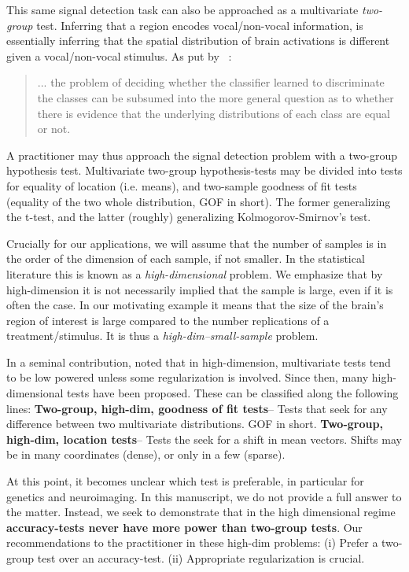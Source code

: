 \documentclass[]{bio}
\begin{document}
This same signal detection task can also be approached as a multivariate \emph{two-group} test.
Inferring that a region encodes vocal/non-vocal information, is essentially inferring that the spatial distribution of brain activations is different given a vocal/non-vocal stimulus. 
As put by ~\cite{pereira_machine_2009}: 
\begin{quote}
	... the problem of deciding whether the classifier learned to discriminate the classes can be subsumed into the more general question as to whether there is evidence that the underlying distributions of each class are equal or not.
\end{quote}
A practitioner may thus approach the signal detection problem with a two-group hypothesis test.
Multivariate two-group hypothesis-tests may be divided into tests for equality of location (i.e. means), and two-sample goodness of fit tests (equality of the two whole distribution, GOF in short).
The former generalizing the t-test, and the latter (roughly) generalizing Kolmogorov-Smirnov's test.


Crucially for our applications, we will assume that the number of samples is in the order of the dimension of each sample, if not smaller. 
In the statistical literature this is known as a \emph{high-dimensional} problem. 
We emphasize that by high-dimension it is not necessarily implied that the sample is large, even if it is often the case. 
In our motivating example it means that the size of the brain's region of interest is large compared to the number replications of a treatment/stimulus. 
It is thus a \emph{high-dim--small-sample} problem. 

In a seminal contribution, \citet{bai1996effect} noted that in high-dimension, multivariate tests tend to be low powered unless some regularization is involved. 
Since then, many high-dimensional tests have been proposed. 
These can be classified along the following lines:
\textbf{Two-group, high-dim, goodness of fit tests}-- Tests that seek for any difference between two multivariate distributions. GOF in short.
\textbf{Two-group, high-dim, location tests}-- Tests the seek for a shift in mean vectors. Shifts may be in many coordinates (dense), or only in a few (sparse). 

At this point, it becomes unclear which test is preferable, in particular for genetics and neuroimaging.
In this manuscript, we do not provide a full answer to the matter.
Instead, we seek to demonstrate that in the high dimensional regime \textbf{accuracy-tests never have more power than two-group tests}.
Our recommendations to the practitioner in these high-dim problems:
(i) Prefer a two-group test over an accuracy-test. 
(ii) Appropriate regularization is crucial. 
\end{document}
